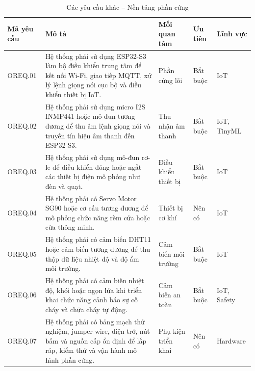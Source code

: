 \documentclass[a4paper,12pt]{article}
\begin{document}
\renewcommand{\arraystretch}{1.3}


\begin{table}[H]
\centering
\caption{Các yêu cầu khác -- Nền tảng phần cứng}
\small
\begin{tabularx}{\linewidth}{|p{1.8cm}|X|p{2.6cm}|p{1.8cm}|p{2.1cm}|}
\hline
\textbf{Mã yêu cầu} & \textbf{Mô tả} & \textbf{Mối quan tâm} & \textbf{Ưu tiên} & \textbf{Lĩnh vực} \\
\hline
OREQ.01 & Hệ thống phải sử dụng ESP32-S3 làm bộ điều khiển trung tâm để kết nối Wi-Fi, giao tiếp MQTT, xử lý lệnh giọng nói cục bộ và điều khiển thiết bị IoT. & Phần cứng lõi & Bắt buộc & IoT \\
\hline
OREQ.02 & Hệ thống phải sử dụng micro I2S INMP441 hoặc mô-đun tương đương để thu âm lệnh giọng nói và truyền tín hiệu âm thanh đến ESP32-S3. & Thu nhận âm thanh & Bắt buộc & IoT, TinyML \\
\hline
OREQ.03 & Hệ thống phải sử dụng mô-đun rơ-le để điều khiển đóng hoặc ngắt các thiết bị điện mô phỏng như đèn và quạt. & Điều khiển thiết bị & Bắt buộc & IoT \\
\hline
OREQ.04 & Hệ thống phải có Servo Motor SG90 hoặc cơ cấu tương đương để mô phỏng chức năng rèm cửa hoặc cửa thông minh. & Thiết bị cơ khí & Nên có & IoT \\
\hline
OREQ.05 & Hệ thống phải có cảm biến DHT11 hoặc cảm biến tương đương để thu thập dữ liệu nhiệt độ và độ ẩm môi trường. & Cảm biến môi trường & Bắt buộc & IoT \\
\hline
OREQ.06 & Hệ thống phải có cảm biến nhiệt độ, khói hoặc ngọn lửa khi triển khai chức năng cảnh báo sự cố cháy và chữa cháy tự động. & Cảm biến an toàn & Bắt buộc & IoT, Safety \\
\hline
OREQ.07 & Hệ thống phải có bảng mạch thử nghiệm, jumper wire, điện trở, nút bấm và nguồn cấp ổn định để lắp ráp, kiểm thử và vận hành mô hình phần cứng. & Phụ kiện triển khai & Nên có & Hardware \\
\hline
\end{tabularx}
\end{table}

\end{document}

